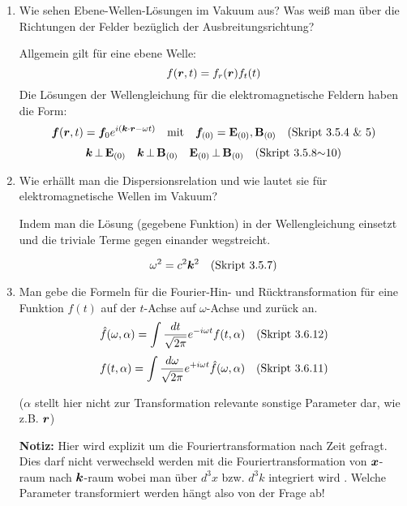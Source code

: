 \begin{enumerate}
  \item Wie sehen Ebene-Wellen-Lösungen im Vakuum aus? Was weiß man %
        über die Richtungen der Felder bezüglich der 
        Ausbreitungsrichtung?
        
        Allgemein gilt für eine ebene Welle:
        $$f(\vb* r , t)=f_r(\vb* r)f_t(t)$$
        Die Lösungen der Wellengleichung für die 
        elektromagnetische Feldern haben die Form:
        \begin{equation*}
          \vb* f(\vb* r, t)=\vb* f_0 e^{i(\vb*k\cdot\vb*r-\omega t)}
          \quad\text{mit}\quad
          \vb* f_{(0)} = \vb E_{(0)}, \vb B_{(0)} \quad\text{(Skript 3.5.4 \& 5)}
        \end{equation*}
        $$\vb* k \,\bot\, \vb E_{(0)} \quad \vb* k\,\bot\,\vb B_{(0)} \quad
        \vb E_{(0)}\,\bot\, \vb B_{(0)}\quad\text{(Skript 3.5.8$\sim$10)}$$

  \item Wie erhällt man die Dispersionsrelation und wie lautet sie für %
        elektromagnetische Wellen im Vakuum?
        \begin{center}
          Indem man die Lösung (gegebene Funktion) in 
          der Wellengleichung einsetzt und die
          triviale Terme gegen einander wegstreicht.
        \end{center}
        \begin{equation*}
          \omega^2 = c^2 \vb* k^2 \quad\text{(Skript 3.5.7)}
        \end{equation*}

  \item Man gebe die Formeln für die Fourier-Hin- und Rücktransformation %
        für eine Funktion $f(t)$ auf der $t$-Achse auf $\omega$-Achse und
        zurück an.
        $$\hat f(\omega, \alpha)=\int \frac{dt}{\sqrt{2\pi}}
              e^{-i\omega t}f(t, \alpha)\quad\text{(Skript 3.6.12)}$$
        $$f(t, \alpha)=\int \frac{d\omega}{\sqrt{2\pi}}
                         e^{+i\omega t}\hat f(\omega, \alpha)
                        \quad\text{(Skript 3.6.11)}$$
        \begin{center}
          ($\alpha$ stellt hier nicht zur Transformation relevante 
          sonstige Parameter dar, wie z.B. $\vb* r$)
        \end{center}
        \textbf{Notiz:} Hier wird explizit um die Fouriertransformation 
        nach Zeit gefragt. Dies darf nicht verwechseld werden mit die 
        Fouriertransformation von $\vb* x$-raum nach $\vb* k$-raum 
        wobei man über
        $d^3x$ bzw. $d^3k$ integriert wird .
        Welche Parameter transformiert werden hängt also von der Frage 
        ab!


\end{enumerate}
